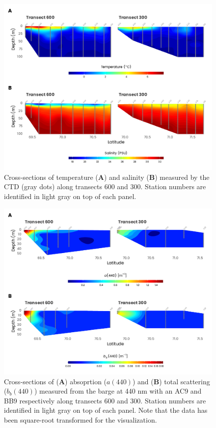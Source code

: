 \documentclass[essd, manuscript]{copernicus}
\begin{document}
\clearpage

\begin{figure}[H]
    \centering
    \includegraphics[scale = 1]{../../../graphs/fig04.pdf}
    \caption{Cross-sections of temperature (\textbf{A}) and salinity (\textbf{B}) measured by the CTD (gray dots) along transects 600 and 300. Station numbers are identified in light gray on top of each panel.}
\end{figure}

\clearpage

\begin{figure}[H]
    \centering
    \includegraphics[scale = 0.85]{../../../graphs/fig05.pdf}
    \caption{Cross-sections of (\textbf{A}) absoprtion ($a(440)$) and (\textbf{B}) total scattering ($b_b(440)$) measured from the barge at 440 nm with an AC9 and BB9 respectively along transects 600 and 300. Station numbers are identified in light gray on top of each panel. Note that the data has been square-root transformed for the visualization.}
\end{figure}
\end{document}
